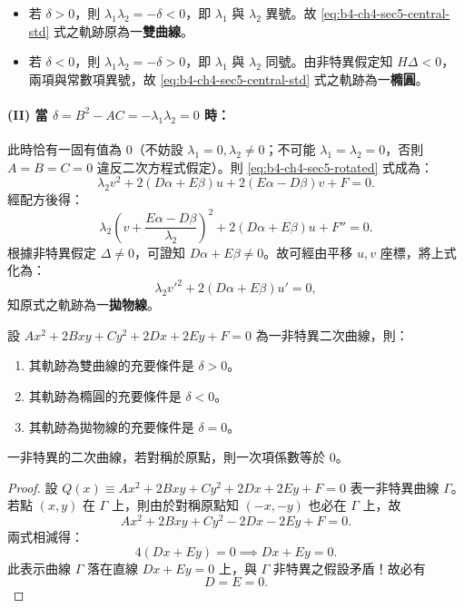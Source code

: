 \begin{itemize}
  \item 若 $\delta > 0$，則 $\lambda_1 \lambda_2 = -\delta < 0$，即 $\lambda_1$ 與 $\lambda_2$ 異號。故 \eqref{eq:b4-ch4-sec5-central-std} 式之軌跡原為一\textbf{雙曲線}。
  \item 若 $\delta < 0$，則 $\lambda_1 \lambda_2 = -\delta > 0$，即 $\lambda_1$ 與 $\lambda_2$ 同號。由非特異假定知 $H\Delta < 0$，兩項與常數項異號，故 \eqref{eq:b4-ch4-sec5-central-std} 式之軌跡為一\textbf{橢圓}。
\end{itemize}

\paragraph*{(II) 當 $\delta = B^2 - AC = -\lambda_1 \lambda_2 = 0$ 時：}
此時恰有一固有值為 0（不妨設 $\lambda_1 = 0, \lambda_2 \ne 0$；不可能 $\lambda_1 = \lambda_2 = 0$，否則 $A = B = C = 0$ 違反二次方程式假定）。則 \eqref{eq:b4-ch4-sec5-rotated} 式成為：
\[
\lambda_2 v^2 + 2(D\alpha + E\beta)u + 2(E\alpha - D\beta)v + F = 0.
\]
經配方後得：
\[
\lambda_2 \left( v + \frac{E\alpha - D\beta}{\lambda_2} \right)^2 + 2(D\alpha + E\beta)u + F'' = 0.
\]
根據非特異假定 $\Delta \ne 0$，可證知 $D\alpha + E\beta \ne 0$。故可經由平移 $u, v$ 座標，將上式化為：
\[
\lambda_2 {v'}^2 + 2(D\alpha + E\beta)u' = 0,
\]
知原式之軌跡為一\textbf{拋物線}。

\begin{theorem}[二次曲線分類定理]
設 $Ax^2 + 2Bxy + Cy^2 + 2Dx + 2Ey + F = 0$ 為一非特異二次曲線，則：
\begin{enumerate}[(1)]
  \item 其軌跡為雙曲線的充要條件是 $\delta > 0$。
  \item 其軌跡為橢圓的充要條件是 $\delta < 0$。
  \item 其軌跡為拋物線的充要條件是 $\delta = 0$。
\end{enumerate}
\end{theorem}

\begin{discussion}
一非特異的二次曲線，若對稱於原點，則一次項係數等於 0。
\end{discussion}

\begin{proof}
設 $Q(x) \equiv Ax^2 + 2Bxy + Cy^2 + 2Dx + 2Ey + F = 0$ 表一非特異曲線 $\Gamma$。若點 $(x, y)$ 在 $\Gamma$ 上，則由於對稱原點知 $(-x, -y)$ 也必在 $\Gamma$ 上，故
\[
Ax^2 + 2Bxy + Cy^2 - 2Dx - 2Ey + F = 0.
\]
兩式相減得：
\[
4(Dx + Ey) = 0 \implies Dx + Ey = 0.
\]
此表示曲線 $\Gamma$ 落在直線 $Dx + Ey = 0$ 上，與 $\Gamma$ 非特異之假設矛盾！故必有
\[
D = E = 0.
\]
\end{proof}

